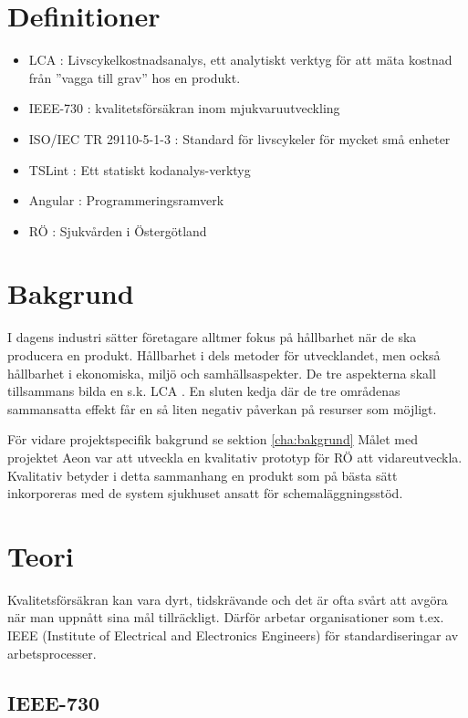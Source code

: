 \section{Definitioner}
\begin{itemize}
	\item LCA :  Livscykelkostnadsanalys, ett analytiskt verktyg för att mäta kostnad från ''vagga till grav'' hos en produkt.
	\item IEEE-730 : kvalitetsförsäkran inom mjukvaruutveckling
	\item ISO/IEC TR 29110-5-1-3 : Standard för livscykeler för mycket små enheter
	\item TSLint : Ett statiskt kodanalys-verktyg
	\item Angular : Programmeringsramverk
	\item RÖ : Sjukvården i Östergötland
\end{itemize}

\section{Bakgrund}
I dagens industri sätter företagare alltmer fokus på hållbarhet när de ska producera en produkt. Hållbarhet i dels metoder för utvecklandet, men också hållbarhet i ekonomiska, miljö och samhällsaspekter.
De tre aspekterna skall tillsammans bilda en s.k. LCA \cite{LCA}. En sluten kedja där de tre områdenas sammansatta effekt får en så liten negativ påverkan på resurser som möjligt.

För vidare projektspecifik bakgrund se sektion \ref{cha:bakgrund}
Målet med projektet Aeon var att utveckla en kvalitativ prototyp för RÖ att vidareutveckla. Kvalitativ betyder i detta sammanhang en produkt som på bästa sätt inkorporeras med de system sjukhuset ansatt för schemaläggningsstöd.

\section{Teori}

Kvalitetsförsäkran kan vara dyrt, tidskrävande och det är ofta svårt att avgöra när man uppnått sina mål tillräckligt\cite{lighthouse}.
Därför arbetar organisationer som t.ex. IEEE (Institute of Electrical and Electronics Engineers) för standardiseringar av arbetsprocesser.

\subsection{IEEE-730}

